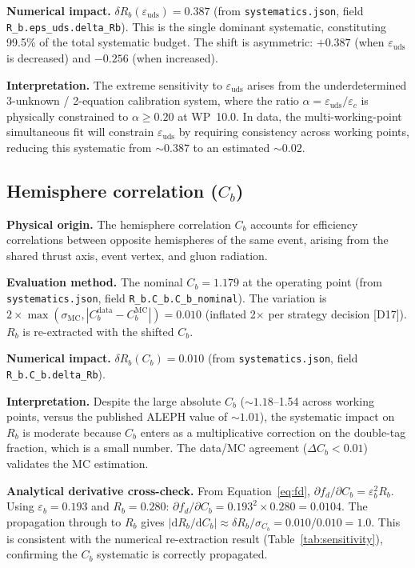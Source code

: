 \documentclass[11pt,a4paper]{article}
\begin{document}
\textbf{Numerical impact.}
$\delta R_b(\varepsilon_\mathrm{uds}) = 0.387$
(from \texttt{systematics.json}, field \texttt{R\_b.eps\_uds.delta\_Rb}).
This is the single dominant systematic, constituting 99.5\% of the total systematic
budget. The shift is asymmetric: $+0.387$ (when $\varepsilon_\mathrm{uds}$ is decreased)
and $-0.256$ (when increased).

\textbf{Interpretation.} The extreme sensitivity to $\varepsilon_\mathrm{uds}$ arises
from the underdetermined 3-unknown / 2-equation calibration system, where the ratio
$\alpha = \varepsilon_\mathrm{uds}/\varepsilon_c$ is physically constrained to
$\alpha \geq 0.20$ at WP~10.0. In data, the multi-working-point simultaneous fit
will constrain $\varepsilon_\mathrm{uds}$ by requiring consistency across working
points, reducing this systematic from $\sim 0.387$ to an estimated $\sim 0.02$.

\subsection{Hemisphere correlation ($C_b$)}
\label{sec:syst_cb}

\textbf{Physical origin.} The hemisphere correlation $C_b$ accounts for efficiency
correlations between opposite hemispheres of the same event, arising from the shared
thrust axis, event vertex, and gluon radiation.

\textbf{Evaluation method.} The nominal $C_b = 1.179$ at the operating point
(from \texttt{systematics.json}, field \texttt{R\_b.C\_b.C\_b\_nominal}). The variation
is $2 \times \max(\sigma_\mathrm{MC}, |C_b^\mathrm{data} - C_b^\mathrm{MC}|) = 0.010$
(inflated 2$\times$ per strategy decision [D17]).
$R_b$ is re-extracted with the shifted $C_b$.

\textbf{Numerical impact.}
$\delta R_b(C_b) = 0.010$
(from \texttt{systematics.json}, field \texttt{R\_b.C\_b.delta\_Rb}).

\textbf{Interpretation.} Despite the large absolute $C_b$ ($\sim 1.18$--1.54 across
working points, versus the published ALEPH value of $\sim 1.01$), the systematic impact
on $R_b$ is moderate because $C_b$ enters as a multiplicative correction on the
double-tag fraction, which is a small number. The data/MC agreement ($\Delta C_b < 0.01$)
validates the MC estimation.

\textbf{Analytical derivative cross-check.}
From Equation~\ref{eq:fd}, $\partial f_d / \partial C_b = \varepsilon_b^2 R_b$.
Using $\varepsilon_b = 0.193$ and $R_b = 0.280$:
$\partial f_d / \partial C_b = 0.193^2 \times 0.280 = 0.0104$.
The propagation through to $R_b$ gives
$|\mathrm{d}R_b/\mathrm{d}C_b| \approx \delta R_b / \sigma_{C_b} = 0.010 / 0.010 = 1.0$.
This is consistent with the numerical re-extraction result (Table~\ref{tab:sensitivity}),
confirming the $C_b$ systematic is correctly propagated.
\end{document}
